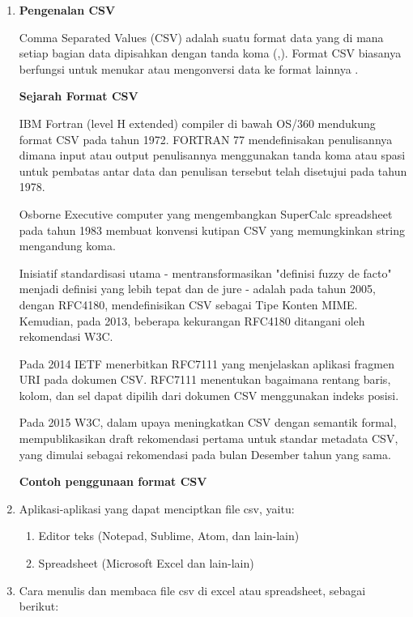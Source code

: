 \begin{enumerate}
	\item 
	\textbf{Pengenalan CSV}
	
	Comma Separated Values (CSV) adalah suatu format data yang di mana setiap bagian data dipisahkan dengan tanda koma (,). Format CSV biasanya berfungsi untuk menukar atau mengonversi data ke format lainnya \cite{shafranovich2005common}.
	
	\textbf{Sejarah Format CSV}
	
	IBM Fortran (level H extended) compiler di bawah OS/360 mendukung format CSV pada tahun 1972. FORTRAN 77 mendefinisakan penulisannya dimana input atau output penulisannya menggunakan tanda koma atau spasi untuk pembatas antar data dan penulisan tersebut telah disetujui pada tahun 1978.
	
	Osborne Executive computer yang mengembangkan SuperCalc spreadsheet pada tahun 1983 membuat konvensi kutipan CSV yang memungkinkan string mengandung koma. 
	
	Inisiatif standardisasi utama - mentransformasikan "definisi fuzzy de facto" menjadi definisi yang lebih tepat dan de jure - adalah pada tahun 2005, dengan RFC4180, mendefinisikan CSV sebagai Tipe Konten MIME. Kemudian, pada 2013, beberapa kekurangan RFC4180 ditangani oleh rekomendasi W3C.
	
	Pada 2014 IETF menerbitkan RFC7111 yang menjelaskan aplikasi fragmen URI pada dokumen CSV. RFC7111 menentukan bagaimana rentang baris, kolom, dan sel dapat dipilih dari dokumen CSV menggunakan indeks posisi.
	
	Pada 2015 W3C, dalam upaya meningkatkan CSV dengan semantik formal, mempublikasikan draft rekomendasi pertama untuk standar metadata CSV, yang dimulai sebagai rekomendasi pada bulan Desember tahun yang sama.
	
	\textbf{Contoh penggunaan format CSV}
	
	
	
	\item Aplikasi-aplikasi yang dapat menciptkan file csv, yaitu:
	\begin{enumerate}
		\item Editor teks (Notepad, Sublime, Atom, dan lain-lain)
		\item Spreadsheet (Microsoft Excel dan lain-lain)
	\end{enumerate}
	
	\item Cara menulis dan membaca file csv di excel atau spreadsheet, sebagai berikut:
	

\end{enumerate}

